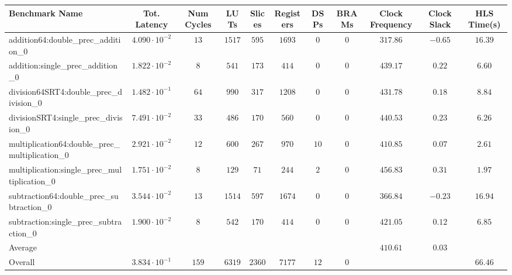 \begin{tabular}{|l|c|c|c|c|c|c|c|c|c|c|}
\hline
Benchmark Name                                   & Tot. Latency            & Num Cycles & LUTs     & Slices   & Registers & DSPs   & BRAMs & Clock Frequency & Clock Slack & HLS Time(s) \\
\hline
addition64:double\_prec\_addition\_0             & $ 4.090 \cdot 10^{-2} $ & $ 13     $ & $ 1517 $ & $ 595  $ & $ 1693  $ & $ 0  $ & $ 0 $ & $ 317.86      $ & $ -0.65   $ & $ 16.39   $ \\
addition:single\_prec\_addition\_0               & $ 1.822 \cdot 10^{-2} $ & $ 8      $ & $ 541  $ & $ 173  $ & $ 414   $ & $ 0  $ & $ 0 $ & $ 439.17      $ & $ 0.22    $ & $ 6.60    $ \\
division64SRT4:double\_prec\_division\_0         & $ 1.482 \cdot 10^{-1} $ & $ 64     $ & $ 990  $ & $ 317  $ & $ 1208  $ & $ 0  $ & $ 0 $ & $ 431.78      $ & $ 0.18    $ & $ 8.84    $ \\
divisionSRT4:single\_prec\_division\_0           & $ 7.491 \cdot 10^{-2} $ & $ 33     $ & $ 486  $ & $ 170  $ & $ 560   $ & $ 0  $ & $ 0 $ & $ 440.53      $ & $ 0.23    $ & $ 6.26    $ \\
multiplication64:double\_prec\_multiplication\_0 & $ 2.921 \cdot 10^{-2} $ & $ 12     $ & $ 600  $ & $ 267  $ & $ 970   $ & $ 10 $ & $ 0 $ & $ 410.85      $ & $ 0.07    $ & $ 2.61    $ \\
multiplication:single\_prec\_multiplication\_0   & $ 1.751 \cdot 10^{-2} $ & $ 8      $ & $ 129  $ & $ 71   $ & $ 244   $ & $ 2  $ & $ 0 $ & $ 456.83      $ & $ 0.31    $ & $ 1.97    $ \\
subtraction64:double\_prec\_subtraction\_0       & $ 3.544 \cdot 10^{-2} $ & $ 13     $ & $ 1514 $ & $ 597  $ & $ 1674  $ & $ 0  $ & $ 0 $ & $ 366.84      $ & $ -0.23   $ & $ 16.94   $ \\
subtraction:single\_prec\_subtraction\_0         & $ 1.900 \cdot 10^{-2} $ & $ 8      $ & $ 542  $ & $ 170  $ & $ 414   $ & $ 0  $ & $ 0 $ & $ 421.05      $ & $ 0.12    $ & $ 6.85    $ \\
\hline
Average                                          & $                     $ & $        $ & $      $ & $      $ & $       $ & $    $ & $   $ & $ 410.61      $ & $ 0.03    $ & $         $ \\
\hline
Overall                                          & $ 3.834 \cdot 10^{-1} $ & $ 159    $ & $ 6319 $ & $ 2360 $ & $ 7177  $ & $ 12 $ & $ 0 $ & $             $ & $         $ & $ 66.46   $ \\
\hline
\end{tabular}
